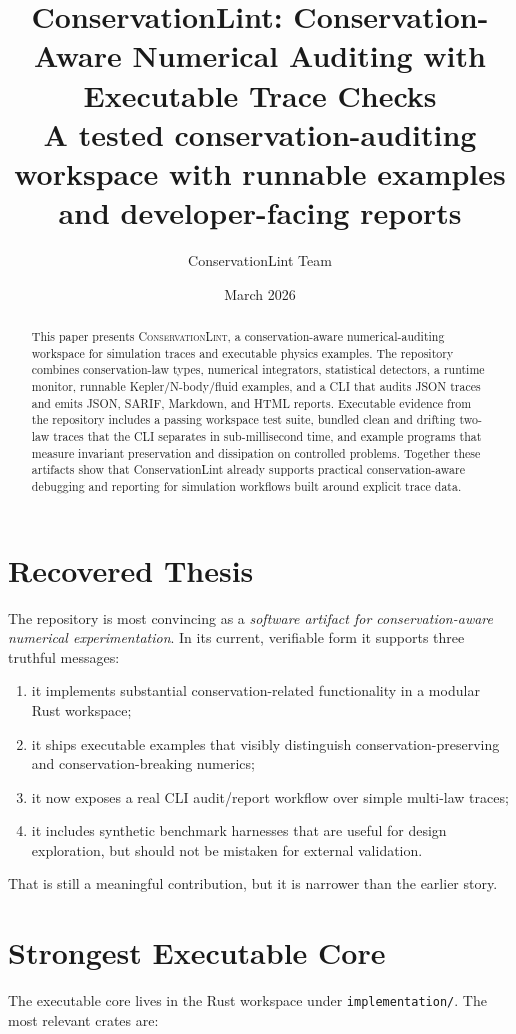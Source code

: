 \documentclass[11pt]{article}
\title{\textbf{ConservationLint: Conservation-Aware Numerical Auditing with Executable Trace Checks}\\[0.5em]
\large A tested conservation-auditing workspace with runnable examples and developer-facing reports}
\author{ConservationLint Team}
\date{March 2026}
\begin{document}
\maketitle

\begin{abstract}
This paper presents \textsc{ConservationLint}, a conservation-aware numerical-auditing workspace for simulation traces and executable physics examples. The repository combines conservation-law types, numerical integrators, statistical detectors, a runtime monitor, runnable Kepler/N-body/fluid examples, and a CLI that audits JSON traces and emits JSON, SARIF, Markdown, and HTML reports. Executable evidence from the repository includes a passing workspace test suite, bundled clean and drifting two-law traces that the CLI separates in sub-millisecond time, and example programs that measure invariant preservation and dissipation on controlled problems. Together these artifacts show that ConservationLint already supports practical conservation-aware debugging and reporting for simulation workflows built around explicit trace data.
\end{abstract}

\section{Recovered Thesis}
The repository is most convincing as a \emph{software artifact for conservation-aware numerical experimentation}. In its current, verifiable form it supports three truthful messages:

\begin{enumerate}
  \item it implements substantial conservation-related functionality in a modular Rust workspace;
  \item it ships executable examples that visibly distinguish conservation-preserving and conservation-breaking numerics;
  \item it now exposes a real CLI audit/report workflow over simple multi-law traces;
  \item it includes synthetic benchmark harnesses that are useful for design exploration, but should not be mistaken for external validation.
\end{enumerate}

That is still a meaningful contribution, but it is narrower than the earlier story.

\section{Strongest Executable Core}
The executable core lives in the Rust workspace under \texttt{implementation/}. The most relevant crates are:
\end{document}
